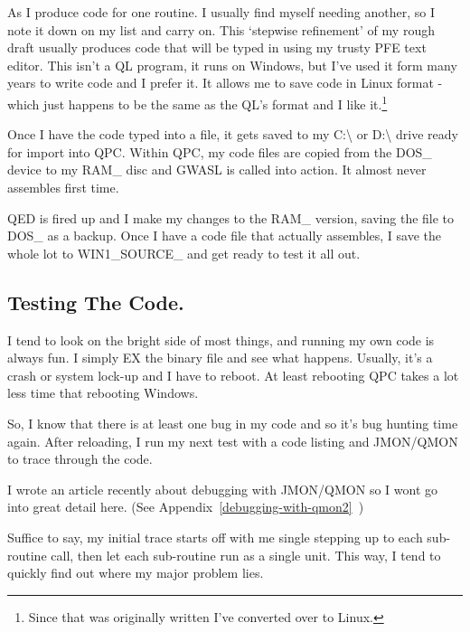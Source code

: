 As I produce code for one routine. I usually find myself needing
      another, so I note it down on my list and carry on. This `stepwise
      refinement' of my rough draft usually produces code that will be typed
      in using my trusty PFE text editor. This isn't a QL program, it runs on
      Windows, but I've used it form many years to write code and I prefer it.
      It allows me to save code in Linux format -{} which just happens to be the
      same as the QL's format and I like it.\footnote{Since that was originally written I've converted over to Linux.}

Once I have the code typed into a file, it gets saved to my C:\textbackslash{} or
      D:\textbackslash{} drive ready for import into QPC. Within QPC, my code files are
      copied from the DOS\_ device to my RAM\_ disc and GWASL is called into
      action. It almost never assembles first time.

QED is fired up and I make my changes to the RAM\_ version, saving
      the file to DOS\_ as a backup. Once I have a code file that actually
      assembles, I save the whole lot to WIN1\_SOURCE\_ and get ready to test it
      all out.

\subsection{Testing The Code.}
\label{ch14-testing}%

I tend to look on the bright side of most things, and running my
      own code is always fun. I simply EX the binary file and see what
      happens. Usually, it's a crash or system lock-{}up and I have to reboot.
      At least rebooting QPC takes a lot less time that rebooting
      Windows.

So, I know that there is at least one bug in my code and so it's
      bug hunting time again. After reloading, I run my next test with a code
      listing and JMON/QMON to trace through the code.

I wrote an article recently about debugging with JMON/QMON so I
      wont go into great detail here. (See Appendix~\ref{debugging-with-qmon2}~)

Suffice to say, my initial trace starts
      off with me single stepping up to each sub-{}routine call, then let each
      sub-{}routine run as a single unit. This way, I tend to quickly find out
      where my major problem lies.

